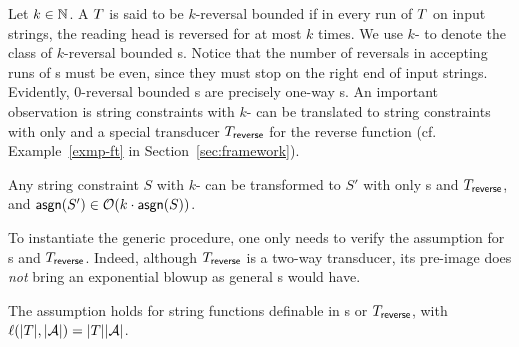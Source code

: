 %

 
Let $k \in \mathbb{N}$. A \PPT{} $T$ is said  to be $k$-reversal bounded if in every run of $T$ on input strings, the reading head is reversed for at most $k$ times. We use  $k$-\RBPPT{} to denote the class of $k$-reversal bounded \PPT{}s. Notice that the number of reversals in accepting runs of \PPT{}s must be even, since they must stop on the right end of input strings. Evidently, $0$-reversal bounded \PPT{}s are precisely one-way \PT{}s.   
%
%
An important observation is string constraints with $k$-\RBPPT{} can be translated to string constraints with only \PT{} and a special transducer $T_{\sf reverse}$ for the reverse function  (cf. Example~\ref{exmp-ft} in Section~\ref{sec:framework}).  

\begin{proposition} \label{prop:trans}
	Any string constraint $S$ with $k$-\RBPPT{} can be transformed to $S'$ with only \PT{}s and $T_{\sf reverse}$, and $ \mathsf{asgn}(S')\in \mathcal{O}(k\cdot \mathsf{asgn}(S))$. 
\end{proposition}

%
To instantiate the generic procedure, one only needs to verify the  \prerec{} assumption for \PT{}s and $T_{\sf reverse}$. Indeed, although $T_{\sf reverse}$ is a two-way transducer, its pre-image does \emph{not} bring an exponential blowup as general \PPT{}s would have. %

\begin{lemma}\label{lem-1pt}
	The \prerec{} assumption holds for string functions definable in \PT{}s or $T_{\sf reverse}$, with $\ell(|T|, |\mathcal{A}|) = |T||\mathcal{A}|$.
\end{lemma}

